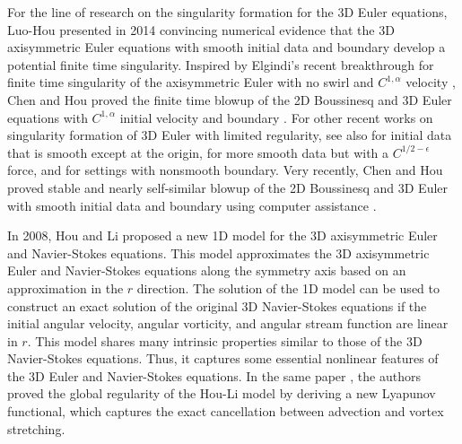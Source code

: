 \documentclass[12pt]{caltech_thesis}
\numberwithin{equation}{section}
\begin{document}
{For the line of research on the singularity formation for the 3D Euler equations,}  Luo-Hou \cite{luo2013potentially-2} presented in 2014 convincing numerical evidence that the 3D axisymmetric Euler equations with smooth initial data and boundary develop a potential finite time singularity. %
Inspired by Elgindi's recent breakthrough for finite time singularity of the axisymmetric Euler with no swirl and $C^{1,\alpha}$ velocity \cite{ elgindi2021finite}, Chen and Hou proved the finite time blowup of the 2D Boussinesq and 3D Euler equations with $C^{1,\alpha}$ initial velocity and boundary \cite{chen2019finite2}. {For other recent works on singularity formation of 3D Euler with limited regularity, see also \cite{chen2023remarks,cordoba2023finite} for initial data that is smooth except at the origin, \cite{cordoba2023blow} for more smooth data but with a 
 $C^{1/2-\epsilon}$ force, and \cite{elgindi2021incompressible, elgindi2019finite} for settings with nonsmooth boundary.} Very recently, Chen and Hou proved stable and nearly self-similar blowup of the 2D Boussinesq and 3D Euler with smooth initial data and boundary using computer assistance \cite{chen2022stable}. 

In 2008, Hou and Li \cite{hou2008dynamic} proposed a new 1D model for the 3D axisymmetric Euler and Navier-Stokes equations. This model approximates the 3D axisymmetric Euler and Navier-Stokes equations along the symmetry axis based on an approximation in the $r$ direction. The solution of the 1D model can be used to construct an exact solution of the original 3D Navier-Stokes equations if the initial angular velocity, angular vorticity, and angular stream function are linear in $r$. This model shares many intrinsic properties similar to those of the 3D Navier-Stokes equations. Thus, it captures some essential nonlinear features of the 3D Euler and Navier-Stokes equations.
In the same paper  \cite{hou2008dynamic}, the authors proved the global regularity of the Hou-Li model by deriving a new Lyapunov functional, which captures the exact cancellation between advection and vortex stretching. 
\end{document}
